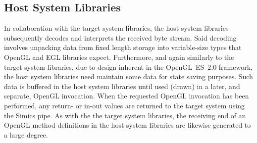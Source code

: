 
\subsection{Host System Libraries}
\label{sec:proposedsolutionandimplementation_hostsystemlibraries}
In collaboration with the target system libraries, the host system libraries subsequently decodes and interprets the received byte stream.
Said decoding involves unpacking data from fixed length storage into variable-size types that OpenGL and EGL libraries expect.
Furthermore, and again similarly to the target system libraries, due to design inherent in the OpenGL~ES~$2.0$ framework, the host system libraries need maintain some data for state saving purposes.
Such data is buffered in the host system libraries until used (drawn) in a later, and separate, OpenGL invocation.
When the requested OpenGL invocation has been performed, any return- or in-out values are returned to the target system using the Simics pipe.
As with the the target system libraries, the receiving end of an OpenGL method definitions in the host system libraries are likewise generated to a large degree.

